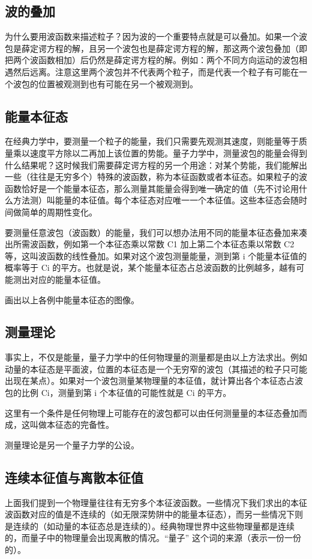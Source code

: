 \subsection{波的叠加}
为什么要用波函数来描述粒子？因为波的一个重要特点就是可以叠加。如果一个波包是薛定谔方程的解，且另一个波包也是薛定谔方程的解，那这两个波包叠加（即把两个波函数相加）后仍然是薛定谔方程的解。例如：两个不同方向运动的波包相遇然后远离。注意这里两个波包并不代表两个粒子，而是代表一个粒子有可能在一个波包的位置被观测到也有可能在另一个被观测到。

\subsection{能量本征态}
在经典力学中，要测量一个粒子的能量，我们只需要先观测其速度，则能量等于质量乘以速度平方除以二再加上该位置的势能。量子力学中，测量波包的能量会得到什么结果呢？这时候我们需要薛定谔方程的另一个用途：对某个势能，我们能解出一些（往往是无穷多个）特殊的波函数，称为本征函数或者本征态。如果粒子的波函数恰好是一个能量本征态，那么测量其能量会得到唯一确定的值（先不讨论用什么方法测）叫能量的本征值。每个本征态对应唯一一个本征值。这些本征态会随时间做简单的周期性变化。

要测量任意波包（波函数）的能量，我们可以想办法用不同的能量本征态叠加来凑出所需波函数，例如第一个本征态乘以常数 C1 加上第二个本征态乘以常数 C2 等，这叫波函数的线性叠加。如果对这个波包测量能量，测到第 i 个能量本征值的概率等于 Ci 的平方。也就是说，某个能量本征态占总波函数的比例越多，越有可能测出对应的能量本征值。

画出以上各例中能量本征态的图像。

\subsection{测量理论}

事实上，不仅是能量，量子力学中的任何物理量的测量都是由以上方法求出。例如动量的本征态是平面波，位置的本征态是一个无穷窄的波包（其描述的粒子只可能出现在某点）。如果对一个波包测量某物理量的本征值，就计算出各个本征态占波包的比例 Ci，测量到第 i 个本征值的可能性就是 Ci 的平方。

这里有一个条件是任何物理上可能存在的波包都可以由任何测量量的本征态叠加而成，这叫做本征态的完备性。

测量理论是另一个量子力学的公设。

\subsection{连续本征值与离散本征值}
上面我们提到一个物理量往往有无穷多个本征波函数。一些情况下我们求出的本征波函数对应的值是不连续的（如无限深势阱中的能量本征态），而另一些情况下则是连续的（如动量的本征态总是连续的）。经典物理世界中这些物理量都是连续的，而量子中的物理量会出现离散的情况。“量子” 这个词的来源（表示一份一份的）。

